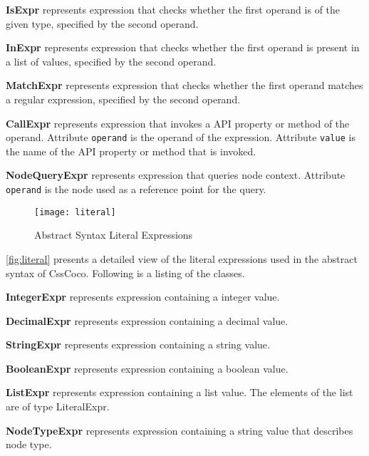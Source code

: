 \begin{description}
\item\textbf{IsExpr} represents expression that checks whether the first operand is of the given type, specified by the second operand.

\item\textbf{InExpr} represents expression that checks whether the first operand is present in a list of values, specified by the second operand.

\item\textbf{MatchExpr} represents expression that checks whether the first operand matches a regular expression, specified by the second operand.

\item\textbf{CallExpr} represents expression that invokes a API property or method of the operand. Attribute \texttt{operand} is the operand of the expression. Attribute \texttt{value} is the name of the API property or method that is invoked.

\item\textbf{NodeQueryExpr} represents expression that queries node context. Attribute \texttt{operand} is the node used as a reference point for the query.

\end{description}

\begin{figure}[h]
  \centering
  \caption{Abstract Syntax Literal Expressions}
  \label{fig:literal}
  \texttt{[image: literal]}
\end{figure}

\autoref{fig:literal} presents a detailed view of the literal expressions used in the abstract syntax of CssCoco. Following is a listing of the classes. 

\begin{description}

\item\textbf{IntegerExpr} represents expression containing a integer value.

\item\textbf{DecimalExpr} represents expression containing a decimal value.

\item\textbf{StringExpr} represents expression containing a string value.

\item\textbf{BooleanExpr} represents expression containing a boolean value.

\item\textbf{ListExpr} represents expression containing a list value. The elements of the list are of type LiteralExpr.

\item\textbf{NodeTypeExpr} represents expression containing a string value that describes node type.

\end{description}

